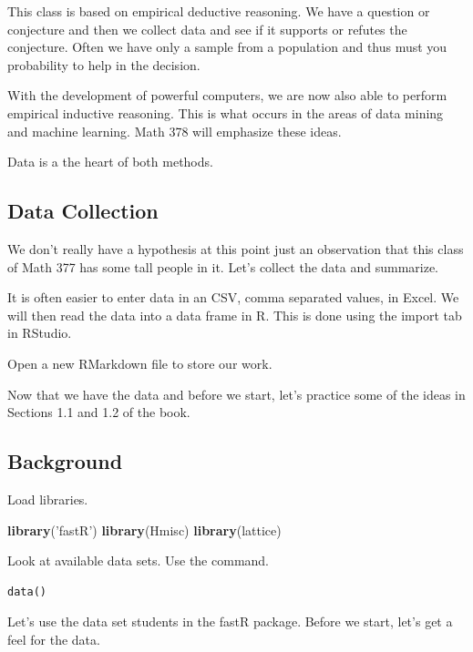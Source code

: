 \documentclass[]{book}
\newenvironment{Shaded}{\begin{snugshade}}{\end{snugshade}}
\newcommand{\KeywordTok}[1]{\textcolor[rgb]{0.13,0.29,0.53}{\textbf{#1}}}
\newcommand{\StringTok}[1]{\textcolor[rgb]{0.31,0.60,0.02}{#1}}
\newcommand{\NormalTok}[1]{#1}
\theoremstyle{definition}
\theoremstyle{definition}
\theoremstyle{definition}
\theoremstyle{remark}
\begin{document}
This class is based on empirical deductive reasoning. We have a question
or conjecture and then we collect data and see if it supports or refutes
the conjecture. Often we have only a sample from a population and thus
must you probability to help in the decision.

With the development of powerful computers, we are now also able to
perform empirical inductive reasoning. This is what occurs in the areas
of data mining and machine learning. Math 378 will emphasize these
ideas.

Data is a the heart of both methods.

\subsection{Data Collection}\label{data-collection}

We don't really have a hypothesis at this point just an observation that
this class of Math 377 has some tall people in it. Let's collect the
data and summarize.

It is often easier to enter data in an CSV, comma separated values, in
Excel. We will then read the data into a data frame in R. This is done
using the import tab in RStudio.

Open a new RMarkdown file to store our work.

Now that we have the data and before we start, let's practice some of
the ideas in Sections 1.1 and 1.2 of the book.

\subsection{Background}\label{background}

Load libraries.

\begin{Shaded}
\begin{Highlighting}[]
\KeywordTok{library}\NormalTok{(}\StringTok{'fastR'}\NormalTok{)}
\KeywordTok{library}\NormalTok{(Hmisc)}
\KeywordTok{library}\NormalTok{(lattice)}
\end{Highlighting}
\end{Shaded}

Look at available data sets. Use the command.

\begin{verbatim}
data()
\end{verbatim}

Let's use the data set students in the fastR package. Before we start,
let's get a feel for the data.
\end{document}
